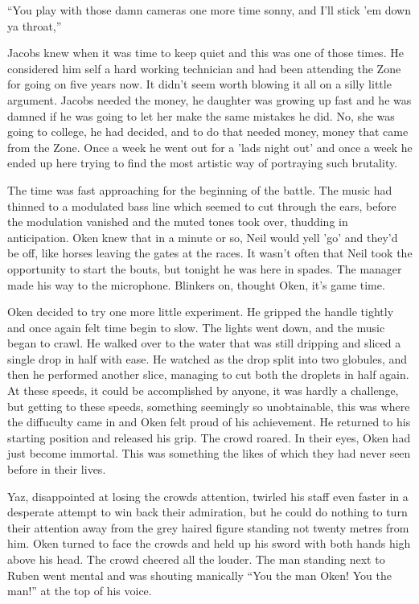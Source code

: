 ``You play with those damn cameras one more time sonny, and I'll stick 'em down ya throat,''

Jacobs knew when it was time to keep quiet and this was one of those times. He considered him self a hard working technician and had been attending the Zone for going on five years now. It didn't seem worth blowing it all on a silly little argument. Jacobs needed the money, he daughter was growing up fast and he was damned if he was going to let her make the same mistakes he did. No, she was going to college, he had decided, and to do that needed money, money that came from the Zone. Once a week he went out for a 'lads night out' and once a week he ended up here trying to find the most artistic way of portraying such brutality.

The time was fast approaching for the beginning of the battle. The music had thinned to a modulated bass line which seemed to cut through the ears, before the modulation vanished and the muted tones took over, thudding in anticipation. Oken knew that in a minute or so, Neil would yell 'go' and they'd be off, like horses leaving the gates at the races. It wasn't often that Neil took the opportunity to start the bouts, but tonight he was here in spades. The manager made his way to the microphone. Blinkers on, thought Oken, it's game time.

Oken decided to try one more little experiment. He gripped the handle tightly and once again felt time begin to slow. The lights went down, and the music began to crawl. He walked over to the water that was still dripping and sliced a single drop in half with ease. He watched as the drop split into two globules, and then he performed another slice, managing to cut both the droplets in half again. At these speeds, it could be accomplished by anyone, it was hardly a challenge, but getting to these speeds, something seemingly so unobtainable, this was where the diffuculty came in and Oken felt proud of his achievement. He returned to his starting position and released his grip. The crowd roared. In their eyes, Oken had just become immortal. This was something the likes of which they had never seen before in their lives.

Yaz, disappointed at losing the crowds attention, twirled his staff even faster in a desperate attempt to win back their admiration, but he could do nothing to turn their attention away from the grey haired figure standing not twenty metres from him. Oken turned to face the crowds and held up his sword with both hands high above his head. The crowd cheered all the louder. The man standing next to Ruben went mental and was shouting manically ``You the man Oken! You the man!'' at the top of his voice.

